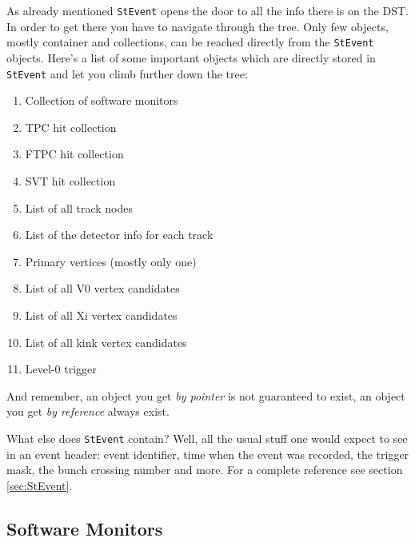 \documentclass[twoside]{article}
\begin{document}
As already mentioned \texttt{StEvent} opens the door to all the info
there is on the DST.  In order to get there you have to navigate
through the tree. Only few objects, mostly container and collections,
can be reached directly from the \texttt{StEvent} objects.  Here's a
list of some important objects which are directly stored in
\texttt{StEvent} and let you climb further down the tree:
\begin{enumerate}
\item Collection of software monitors
\item TPC hit collection
\item FTPC hit collection
\item SVT hit collection
\item List of all track nodes
\item List of the detector info for each track
\item Primary vertices (mostly only one)
\item List of all V0 vertex candidates
\item List of all Xi vertex candidates
\item List of all kink vertex candidates
\item Level-0 trigger
\end{enumerate}
And remember, an object you get \emph{by pointer} is not guaranteed to
exist, an object you get \emph{by reference} always exist.

What else does \texttt{StEvent} contain? Well, all the usual stuff one
would expect to see in an event header: event identifier, time when
the event was recorded, the trigger mask, the bunch crossing number
and more. For a complete reference see section \ref{sec:StEvent}.

\subsection{Software Monitors}
\end{document}
